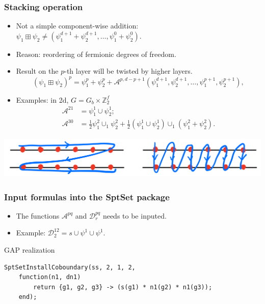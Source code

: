 \documentclass[xcolor=table, aspectratio=169]{beamer}
\begin{document}
\begin{frame}
	\frametitle{Stacking operation}
	\begin{itemize}
		\item Not a simple component-wise addition:
		$\psi_1\boxplus\psi_2\neq (\psi_1^{d+1}+\psi_2^{d+1},\ldots,\psi_1^0+\psi_2^0)$.
		\item Reason: reordering of fermionic degrees of freedom.
		\item Result on the $p$-th layer will be twisted by higher layers.
		\[(\psi_1\boxplus\psi_2)^p = \psi_1^p + \psi_2^p
    + \mathcal A^{p,d-p+1}(\psi_1^{d+1},\psi_2^{d+1},\ldots,\psi_1^{p+1}, \psi_2^{p+1}),\]
		\item Examples: in 2d, $G=G_b\times\mathbb Z_2^f$
		\begin{align*}
		  \mathcal A^{21} &= \psi^1_1\cup\psi^1_2;\\
		  \mathcal A^{30} &= \frac12\psi^2_1\cup_1\psi^2_2 + \frac12 (\psi^1_1\cup\psi^1_2)\cup_1(\psi^2_1+\psi^2_2).
		\end{align*}
	\end{itemize}
	\begin{center}
		\includegraphics[height=2cm]{forder}
	\end{center}
\end{frame}

\begin{frame}[fragile]
	\frametitle{Input formulas into the SptSet package}
	\begin{itemize}
		\item The functions $\mathcal A^{pq}$ and $\mathcal D^{pq}_r$ needs to be inputed.
		\item Example: $\mathcal D_2^{12} = s\cup\psi^1\cup\psi^1$.
	\end{itemize}

	\begin{block}{GAP realization}
	\begin{lstlisting}[basicstyle=\footnotesize,morekeywords={function,return,local,if,fi,then,end},showspaces=false,showtabs=false, keywordstyle=\color{blue}]
	SptSetInstallCoboundary(ss, 2, 1, 2,
	function(n1, dn1)
		return {g1, g2, g3} -> (s(g1) * n1(g2) * n1(g3));
	end);
	\end{lstlisting}
	\end{block}

\end{frame}
\end{document}
